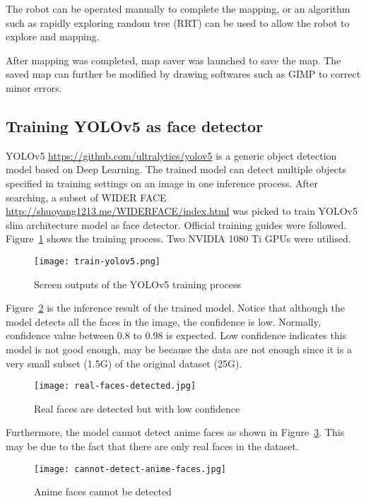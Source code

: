 The robot can be operated manually to complete the mapping, or an algorithm such as rapidly exploring random tree (RRT) can be used to allow the robot to explore and mapping.

After mapping was completed, map saver was launched to save the map. The saved map can further be modified by drawing softwares such as GIMP to correct minor errors.


\subsection{Training YOLOv5 as face detector}

YOLOv5 \url{https://github.com/ultralytics/yolov5} is a generic object detection model based on Deep Learning. The trained model can detect multiple objects specified in training settings on an image in one inference process. After searching, a subset of WIDER FACE \url{http://shuoyang1213.me/WIDERFACE/index.html} was picked to train YOLOv5 slim architecture model as face detector. Official training guides were followed. Figure~\ref{fig:train-yolov5} shows the training process. Two NVIDIA 1080 Ti GPUs were utilised.

\begin{figure}[htbp]
   \centering
   \texttt{[image: train-yolov5.png]}
   \caption{Screen outputs of the YOLOv5 training process}
   \label{fig:train-yolov5}
\end{figure}

Figure~\ref{fig:real-faces-detected} is the inference result of the trained model. Notice that although the model detects all the faces in the image, the confidence is low. Normally, confidence value between 0.8 to 0.98 is expected. Low confidence indicates this model is not good enough, may be because the data are not enough since it is a very small subset (1.5G) of the original dataset (25G).

\begin{figure}[htbp]
   \centering
   \texttt{[image: real-faces-detected.jpg]}
   \caption{Real faces are detected but with low confidence}
   \label{fig:real-faces-detected}
\end{figure}

Furthermore, the model cannot detect anime faces as shown in Figure~\ref{fig:cannot-detect-anime-faces}. This may be due to the fact that there are only real faces in the dataset.

\begin{figure}[htbp]
   \centering
   \texttt{[image: cannot-detect-anime-faces.jpg]}
   \caption{Anime faces cannot be detected}
   \label{fig:cannot-detect-anime-faces}
\end{figure}


